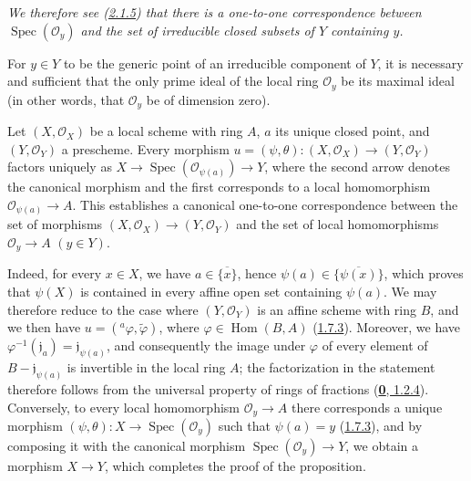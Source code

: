 \emph{We therefore see (\hyperref[I.2.1.5]{2.1.5}) that there is a
one-to-one correspondence between $\operatorname{Spec}(\mathscr{O}_y)$ and
the set of irreducible closed subsets of $Y$ containing $y$.}

\begin{corollary}[2.4.3]
\label{I.2.4.3}
For $y\in Y$ to be the generic point of an irreducible component of
$Y$, it is necessary and sufficient that the only prime ideal of the local
ring $\mathscr{O}_y$ be its maximal ideal \textup{(in other words, that}
$\mathscr{O}_y$ \textup{be} of dimension zero).
\end{corollary}

\begin{proposition}[2.4.4]
\label{I.2.4.4}
Let $(X,\mathscr{O}_X)$ be a local scheme with ring $A$, $a$ its unique
closed point, and $(Y,\mathscr{O}_Y)$ a prescheme. Every morphism
$u=(\psi,\theta):(X,\mathscr{O}_X)\to(Y,\mathscr{O}_Y)$ factors uniquely
as $X\to\operatorname{Spec}(\mathscr{O}_{\psi(a)})\to Y$, where the second
arrow denotes the canonical morphism and the first corresponds to a local
homomorphism $\mathscr{O}_{\psi(a)}\to A$. This establishes a canonical
one-to-one correspondence between the set of morphisms
$(X,\mathscr{O}_X)\to(Y,\mathscr{O}_Y)$ and the set of local homomorphisms
$\mathscr{O}_y\to A$ $(y\in Y)$.
\end{proposition}

Indeed, for every $x\in X$, we have $a\in\overline{\{x\}}$, hence
$\psi(a)\in\overline{\{\psi(x)\}}$, which proves that $\psi(X)$ is contained
in every affine open set containing $\psi(a)$. We may therefore reduce to
the case where $(Y,\mathscr{O}_Y)$ is an affine scheme with ring $B$, and we
then have $u=({}^a\varphi,\widetilde{\varphi})$, where
$\varphi\in\operatorname{Hom}(B,A)$ (\hyperref[I.1.7.3]{1.7.3}).
Moreover, we have $\varphi^{-1}(\mathfrak{j}_a)=\mathfrak{j}_{\psi(a)}$, and
consequently the image under $\varphi$ of every element of
$B-\mathfrak{j}_{\psi(a)}$ is invertible in the local ring $A$; the
factorization in the statement therefore follows from the universal property
of rings of fractions (\hyperref[0.1.2.4]{\textbf{0}, 1.2.4}). Conversely, to
every local homomorphism $\mathscr{O}_y\to A$ there corresponds a unique
morphism $(\psi,\theta):X\to\operatorname{Spec}(\mathscr{O}_y)$ such that
$\psi(a)=y$ (\hyperref[I.1.7.3]{1.7.3}), and by composing it with the
canonical morphism $\operatorname{Spec}(\mathscr{O}_y)\to Y$, we obtain a
morphism $X\to Y$, which completes the proof of the proposition.

